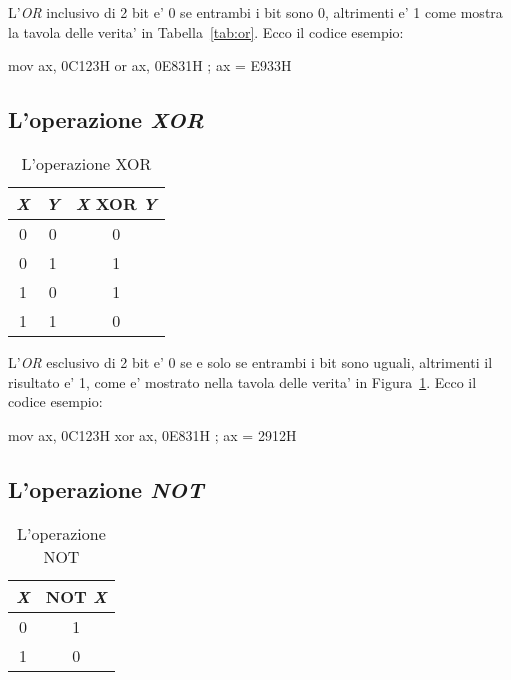 L'\emph{OR} inclusivo di 2 bit e' 0 se entrambi i bit sono 0, altrimenti
e' 1 come mostra la tavola delle verita' in Tabella~\ref{tab:or}. Ecco il
codice esempio: 
\begin{AsmCodeListing}[frame=none]
      mov    ax, 0C123H
      or     ax, 0E831H          ; ax = E933H
\end{AsmCodeListing}

\subsection{L'operazione \emph{XOR}}

\begin{table}
\centering
\begin{tabular}{|c|c|c|}
\hline
\emph{X} & \emph{Y} & \emph{X} XOR \emph{Y} \\
\hline \hline
0 & 0 & 0 \\
0 & 1 & 1 \\
1 & 0 & 1 \\
1 & 1 & 0 \\
\hline
\end{tabular}
\caption{L'operazione XOR \label{tab:xor}}
\end{table}

L'\emph{OR} esclusivo di 2 bit e' 0 se e solo se entrambi i 
bit sono uguali, altrimenti il risultato e' 1, come e' mostrato
nella tavola delle verita' in Figura~\ref{tab:xor}. Ecco il
codice esempio: 

\begin{AsmCodeListing}[frame=none]
      mov    ax, 0C123H
      xor    ax, 0E831H          ; ax = 2912H
\end{AsmCodeListing}

\subsection{L'operazione \emph{NOT}}

\begin{table}[t]
\centering
\begin{tabular}{|c|c|}
\hline
\emph{X} & NOT \emph{X} \\
\hline \hline
0 & 1 \\
1 & 0 \\
\hline
\end{tabular}
\caption{L'operazione NOT \label{tab:not}}
\end{table}

